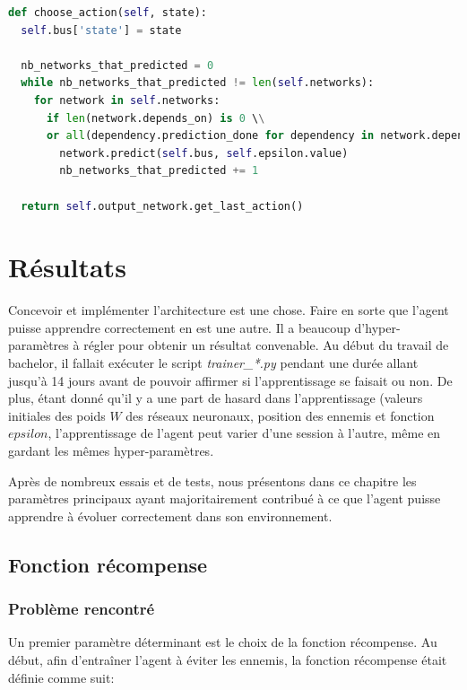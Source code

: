 \documentclass[11pt,a4paper]{report}
\begin{document}
  \begin{lstlisting}[language=python]
def choose_action(self, state):
  self.bus['state'] = state

  nb_networks_that_predicted = 0
  while nb_networks_that_predicted != len(self.networks):
    for network in self.networks:
      if len(network.depends_on) is 0 \\
      or all(dependency.prediction_done for dependency in network.depends_on):
        network.predict(self.bus, self.epsilon.value)
        nb_networks_that_predicted += 1

  return self.output_network.get_last_action()
  \end{lstlisting} 
  

  \chapter{Résultats}
  
  \par Concevoir et implémenter l'architecture est une chose. Faire en sorte que l'agent puisse apprendre correctement en est une autre. Il a beaucoup d'hyper-paramètres  à régler pour obtenir un résultat convenable. Au début du travail de bachelor, il fallait exécuter le script \textit{trainer\_*.py} pendant une durée allant jusqu'à 14 jours avant de pouvoir affirmer si l'apprentissage se faisait ou non. De plus, étant donné qu'il y a une part de hasard dans l'apprentissage (valeurs initiales des poids $W$ des réseaux neuronaux, position des ennemis et fonction $epsilon$, l'apprentissage de l'agent peut varier d'une session à l'autre, même en gardant les mêmes hyper-paramètres. 
  
  \par Après de nombreux essais et de tests, nous présentons dans ce chapitre les paramètres principaux ayant majoritairement contribué à ce que l'agent puisse apprendre à évoluer correctement dans son environnement. 
  
  \section{Fonction récompense}
  
  \subsection{Problème rencontré}
  
  \par Un premier paramètre déterminant est le choix de la fonction récompense. Au début, afin d’entraîner l'agent à éviter les ennemis, la fonction récompense était définie comme suit: 
  
\end{document}
